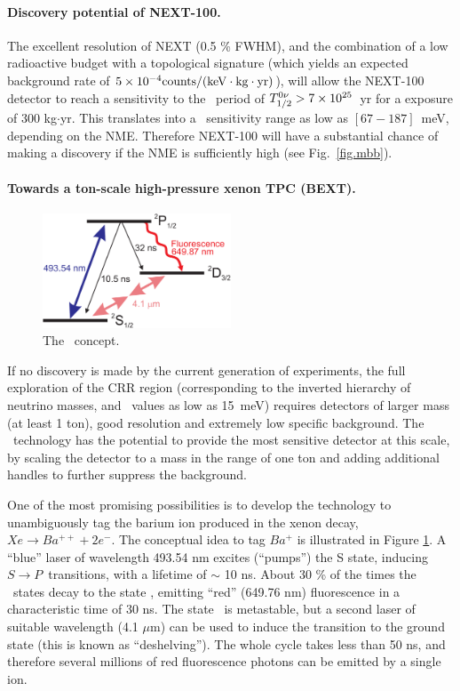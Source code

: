 \paragraph{Discovery potential of NEXT-100.}

The excellent resolution of NEXT (0.5 \% FWHM), and the combination of a low radioactive budget with a topological signature (which yields an expected background rate of $5 \times 10^{-4} \rm counts/(keV \cdot kg \cdot yr)$), will allow the NEXT-100 detector to reach a sensitivity to the \bbonu\ period of $T_{1/2}^{0\nu} > 7 \times 10^{25}$~yr for a exposure of 300 kg$\cdot$yr. This translates into a \mbb\ sensitivity range as low as $[67-187]$~meV, depending on the NME. Therefore NEXT-100 will have a substantial chance of making a discovery if the NME is sufficiently high (see Fig.~\ref{fig.mbb}). 

\paragraph{Towards a ton-scale high-pressure xenon TPC (BEXT).}

\begin{figure}
\centering
\includegraphics[width=0.50\textwidth]{img/levelscheme2.pdf}
\caption{\small The \BATA\ concept.} \label{fig.BATA}
\end{figure}

If no discovery is made by the current generation of experiments, the full exploration of the CRR region (corresponding to the inverted hierarchy of neutrino masses, and \mbb\ values as low as 15~meV) requires detectors of larger mass (at least 1 ton), good resolution and extremely low specific background. The \HPXE\ technology has the potential to provide the most sensitive detector at this scale, by scaling the detector to a mass in the range of one ton and adding additional handles to further suppress the background. 

One of the most promising possibilities is to develop the technology to unambiguously tag the barium ion produced in the xenon decay, $Xe \rightarrow Ba^{++} + 2 e^-$. The conceptual idea to tag $Ba^{+}$ is illustrated in Figure \ref{fig.BATA}. A ``blue'' laser of wavelength 493.54 nm excites (``pumps'') the S state, inducing $S \rightarrow P$~transitions, with a lifetime of $\sim$ 10 ns. About 30 \% of the times the \TwoP\ states decay to the state \TwoD, emitting ``red'' (649.76 nm) fluorescence in a characteristic time of 30 ns. The state \TwoD\ is metastable, but a second laser of suitable wavelength (4.1 $\mu$m) can be used to induce the transition to the ground state (this is known as ``deshelving'').  The whole cycle takes less than 50 ns, and therefore several millions of red fluorescence photons can be emitted by a single ion. 

